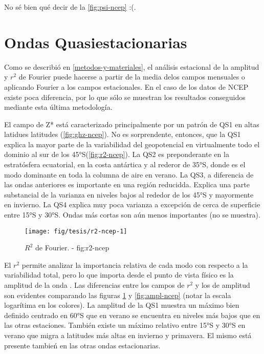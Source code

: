 \documentclass[spanish,a4paper]{book}
\begin{document}
No sé bien qué decir de la \autoref{fig:psi-ncep} :(.

\section{Ondas Quasiestacionarias}\label{ondas-quasiestacionarias}

Como se describió en \autoref{metodos-y-materiales}, el análisis
estacional de la amplitud y \(r^2\) de Fourier puede hacerse a partir de
la media delos campos mensuales o aplicando Fourier a los campos
estacionales. En el caso de los datos de NCEP existe poca diferencia,
por lo que sólo se muestran los resultados conseguidos mediante esta
última metodología.

El campo de Z* está caracterizado principalmente por un patrón de QS1 en
altas latidues latitudes (\autoref{fig:ghz-ncep}). No es sorprendente,
entonces, que la QS1 explica la mayor parte de la variabilidad del
geopotencial en virtualmente todo el dominio al sur de los
45°S(\autoref{fig:r2-ncep}). La QS2 es preponderante en la estratósfera
ecuatorial, en la costa antártica y al rederor de 35°S, donde es el modo
dominante en toda la columna de aire en verano. La QS3, a diferencia de
las ondas anteriores es importante en una región reducidda. Explica una
parte substancial de la varianza en niveles bajos al rededor de los 45°S
y mayormente en invierno. La QS4 explica muy poca varianza a excepción
de cerca de superficie entre 15°S y 30°S. Ondas más cortas son aún menos
importantes (no se muestra).

\begin{figure}

{\centering \texttt{[image: fig/tesis/r2-ncep-1]} 

}

\caption{$R^2$ de Fourier. - fig:r2-ncep}\label{fig:r2-ncep}
\end{figure}

El \(r^2\) permite analizar la importancia relativa de cada modo con
respecto a la variabilidad total, pero lo que importa desde el punto de
vista físico es la amplitud de la onda
. Las diferencias entre
los campos de \(r^2\) y los de amplitud son evidentes comparando las
figuras \ref{fig:r2-ncep} y \ref{fig:ampl-ncep} (notar la escala
logarítima en los colores). La amplitud de la QS1 muestra un máximo bien
definido centrado en 60°S que en verano se encuentra en niveles más
bajos que en las otras estaciones. También existe un máximo relativo
entre 15°S y 30°S en verano que migra a latitudes más altas en invierno
y primavera. El mismo está presente tambień en las otras ondas
estacionarias.
\end{document}
